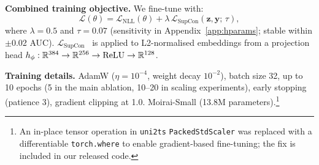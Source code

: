 \textbf{Combined training objective.}
We fine-tune with:
\begin{equation}
  \label{eq:combined_loss}
  \mathcal{L}(\theta) =
    \mathcal{L}_{\text{NLL}}(\theta) +
    \lambda\,\mathcal{L}_{\text{SupCon}}(\mathbf{z}, \mathbf{y};\, \tau),
\end{equation}
where $\lambda = 0.5$ and $\tau = 0.07$ (sensitivity in
Appendix~\ref{app:hparams}; stable within $\pm$0.02 AUC).
$\mathcal{L}_{\text{SupCon}}$~\cite{khosla2020supcon} is applied to
L2-normalised embeddings from a projection head
$h_\phi: \mathbb{R}^{384} \to \mathbb{R}^{256} \to \text{ReLU} \to \mathbb{R}^{128}$.

\textbf{Training details.}
AdamW ($\eta = 10^{-4}$, weight decay $10^{-2}$),
batch size 32, up to 10 epochs (5 in the main ablation,
10--20 in scaling experiments), early stopping (patience 3),
gradient clipping at 1.0.  Moirai-Small (13.8M parameters).\footnote{%
  An in-place tensor operation in \texttt{uni2ts} \texttt{PackedStdScaler}
  was replaced with a differentiable \texttt{torch.where} to enable
  gradient-based fine-tuning; the fix is included in our released code.}
